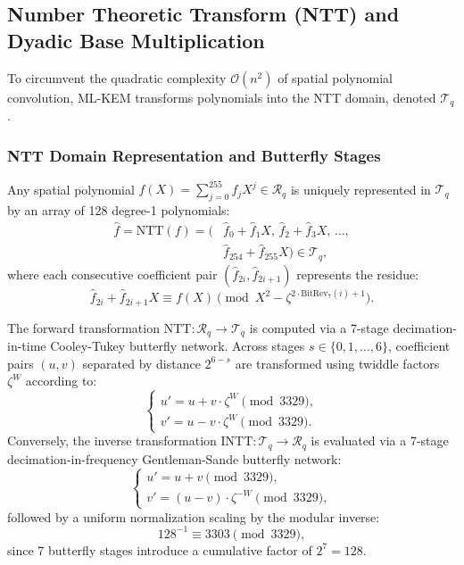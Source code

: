 \subsection{Number Theoretic Transform (NTT) and Dyadic Base Multiplication}
\label{sec:prelim_ntt}

To circumvent the quadratic complexity $\mathcal{O}(n^2)$ of spatial polynomial convolution, \mbox{ML-KEM} transforms polynomials into the NTT domain, denoted $\mathcal{T}_q$.

\subsubsection{NTT Domain Representation and Butterfly Stages}
Any spatial polynomial $f(X) = \sum_{j=0}^{255} f_j X^j \in \mathcal{R}_q$ is uniquely represented in $\mathcal{T}_q$ by an array of 128 degree-1 polynomials:
\begin{equation}
\label{eq:ntt_domain_rep}
\begin{aligned}
\hat{f} = \text{NTT}(f) = \big( &\hat{f}_0 + \hat{f}_1 X, \, \hat{f}_2 + \hat{f}_3 X, \, \dots, \\
&\hat{f}_{254} + \hat{f}_{255} X \big) \in \mathcal{T}_q,
\end{aligned}
\end{equation}
where each consecutive coefficient pair $(\hat{f}_{2i}, \hat{f}_{2i+1})$ represents the residue:
\begin{equation}
\label{eq:ntt_residue_equiv}
\hat{f}_{2i} + \hat{f}_{2i+1} X \equiv f(X) \pmod{X^2 - \zeta^{2\cdot\text{BitRev}_7(i) + 1}}.
\end{equation}

The forward transformation $\text{NTT}: \mathcal{R}_q \to \mathcal{T}_q$ is computed via a 7-stage decimation-in-time Cooley-Tukey butterfly network. Across stages $s \in \{0, 1, \dots, 6\}$, coefficient pairs $(u, v)$ separated by distance $2^{6-s}$ are transformed using twiddle factors $\zeta^W$ according to:
\begin{equation}
\label{eq:cooley_tukey}
\begin{cases}
u' = u + v \cdot \zeta^W \pmod{3329}, \\
v' = u - v \cdot \zeta^W \pmod{3329}.
\end{cases}
\end{equation}
Conversely, the inverse transformation $\text{INTT}: \mathcal{T}_q \to \mathcal{R}_q$ is evaluated via a 7-stage decimation-in-frequency Gentleman-Sande butterfly network:
\begin{equation}
\label{eq:gentleman_sande}
\begin{cases}
u' = u + v \pmod{3329}, \\
v' = (u - v) \cdot \zeta^{-W} \pmod{3329},
\end{cases}
\end{equation}
followed by a uniform normalization scaling by the modular inverse:
\begin{equation}
\label{eq:intt_scalar}
128^{-1} \equiv 3303 \pmod{3329},
\end{equation}
since 7 butterfly stages introduce a cumulative factor of $2^7 = 128$.

